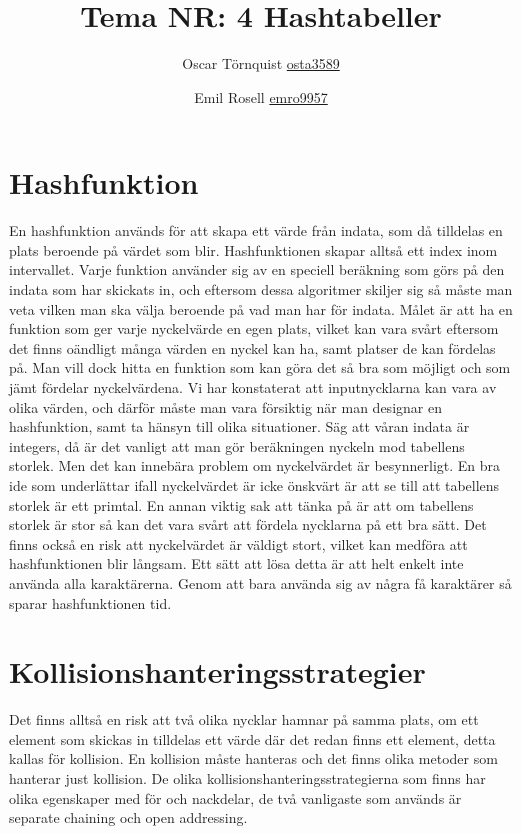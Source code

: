 \documentclass[a5paper,10pt,oneside]{article}
\title{Tema NR: 4 Hashtabeller}
\author{Oscar Törnquist \url{osta3589} \and Emil Rosell \url{emro9957}}
\begin{document}
\maketitle

\section*{Hashfunktion}
En hashfunktion används för att skapa ett värde från indata, som då tilldelas en plats beroende på värdet som blir. Hashfunktionen skapar alltså ett index inom intervallet. Varje funktion använder sig av en speciell beräkning som görs på den indata som har skickats in, och eftersom dessa algoritmer skiljer sig så måste man veta vilken man ska välja beroende på vad man har för indata. Målet är att ha en funktion som ger varje nyckelvärde en egen plats, vilket kan vara svårt eftersom det finns oändligt många värden en nyckel kan ha, samt platser de kan fördelas på. Man vill dock hitta en funktion som kan göra det så bra som möjligt och som jämt fördelar nyckelvärdena. Vi har konstaterat att inputnycklarna kan vara av olika värden, och därför måste man vara försiktig när man designar en hashfunktion, samt ta hänsyn till olika situationer. Säg att våran indata är integers, då är det vanligt att man gör beräkningen nyckeln mod tabellens storlek. Men det kan innebära problem om nyckelvärdet är besynnerligt. En bra ide som underlättar ifall nyckelvärdet är icke önskvärt är att se till att tabellens storlek är ett primtal. En annan viktig sak att tänka på är att om tabellens storlek är stor så kan det vara svårt att fördela nycklarna på ett bra sätt. Det finns också en risk att nyckelvärdet är väldigt stort, vilket kan medföra att hashfunktionen blir långsam. Ett sätt att lösa detta är att helt enkelt inte använda alla karaktärerna. Genom att bara använda sig av några få karaktärer så sparar hashfunktionen tid.

\section*{Kollisionshanteringsstrategier}
Det finns alltså en risk att två olika nycklar hamnar på samma plats, om ett element som skickas in tilldelas ett värde där det redan finns ett element, detta kallas för kollision. En kollision måste hanteras och det finns olika metoder som hanterar just kollision. De olika kollisionshanteringsstrategierna som finns har olika egenskaper med för och nackdelar, de två vanligaste som används är separate chaining och open addressing.
\end{document}
